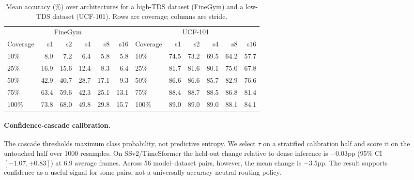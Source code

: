 \documentclass[runningheads]{llncs}
\newcommand{\tabtight}{\setlength{\tabcolsep}{3.5pt}\renewcommand{\arraystretch}{1.12}}
\newcommand{\TDS}{\textsc{TDS}}
\newcommand{\rev}[1]{\textcolor{revblue}{#1}}
\newcommand{\revdel}[1]{}
\begin{document}
\begin{table}[!htbp]
\centering
\caption{Mean accuracy (\%) over architectures for a high-\TDS{} dataset (FineGym) and a low-\TDS{} dataset (UCF-101). Rows are coverage; columns are stride.}
\label{tab:coverage_stride_examples}
\scriptsize\tabtight
\begin{adjustbox}{max width=\textwidth}
\begin{tabular}{l rrrrr @{\hskip18pt} l rrrrr}
\toprule
\multicolumn{6}{c}{FineGym} & \multicolumn{6}{c}{UCF-101} \\
\cmidrule(lr){1-6}\cmidrule(lr){7-12}
Coverage & s1 & s2 & s4 & s8 & s16 & Coverage & s1 & s2 & s4 & s8 & s16 \\
\midrule
10\%  &  8.0 &  7.2 &  6.4 &  5.8 &  5.8 & 10\%  & 74.5 & 73.2 & 69.5 & 64.2 & 57.7 \\
25\%  & 16.9 & 15.6 & 12.4 &  8.3 &  6.4 & 25\%  & 81.7 & 81.6 & 80.1 & 75.0 & 67.8 \\
50\%  & 42.9 & 40.7 & 28.7 & 17.1 &  9.3 & 50\%  & 86.6 & 86.6 & 85.7 & 82.9 & 76.6 \\
75\%  & 63.4 & 59.6 & 42.3 & 25.1 & 13.1 & 75\%  & 88.4 & 88.7 & 88.5 & 86.8 & 81.4 \\
100\% & 73.8 & 68.0 & 49.8 & 29.8 & 15.7 & 100\% & 89.0 & 89.0 & 89.0 & 88.1 & 84.1 \\
\bottomrule
\end{tabular}
\end{adjustbox}
\end{table}

\paragraph{\rev{Confidence-cascade calibration.}\revdel{Entropy-threshold calibration.}}
\revdel{The entropy router is not trained; it reuses two fixed inference outputs and sweeps a scalar confidence threshold on the evaluation split. The threshold should be selected on a held-out calibration split.} \rev{The cascade thresholds maximum class probability, not predictive entropy. We select $\tau$ on a stratified calibration half and score it on the untouched half over 1000 resamples. On SSv2/TimeSformer the held-out change relative to dense inference is $-0.03$pp (95\% CI $[-1.07,+0.83]$) at 6.9 average frames. Across 56 model--dataset pairs, however, the mean change is $-3.5$pp. The result supports confidence as a useful signal for some pairs, not a universally accuracy-neutral routing policy.}

\end{document}
